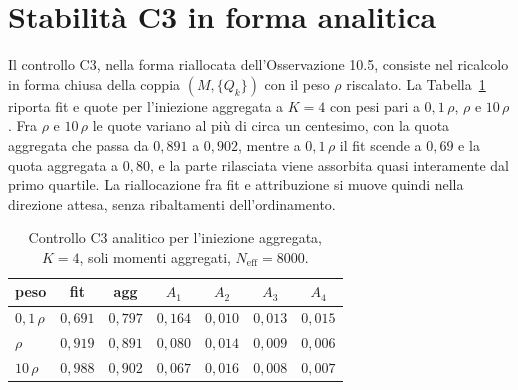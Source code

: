 \documentclass[11pt,a4paper]{article}
\newcommand{\Neff}{N_{\mathrm{eff}}}
\begin{document}
\section{Stabilit\`a C3 in forma analitica}\label{sec:c3}
Il controllo C3, nella forma riallocata dell'Osservazione 10.5, consiste nel ricalcolo in forma chiusa della coppia $(M,\{Q_k\})$ con il peso $\rho$ riscalato. La Tabella~\ref{tab:c3} riporta fit e quote per l'iniezione aggregata a $K=4$ con pesi pari a $0{,}1\,\rho$, $\rho$ e $10\,\rho$. Fra $\rho$ e $10\,\rho$ le quote variano al pi\`u di circa un centesimo, con la quota aggregata che passa da $0{,}891$ a $0{,}902$, mentre a $0{,}1\,\rho$ il fit scende a $0{,}69$ e la quota aggregata a $0{,}80$, e la parte rilasciata viene assorbita quasi interamente dal primo quartile. La riallocazione fra fit e attribuzione si muove quindi nella direzione attesa, senza ribaltamenti dell'ordinamento.

\begin{table}[t]
\centering\small
\caption{Controllo C3 analitico per l'iniezione aggregata, $K=4$, soli momenti aggregati, $\Neff=8000$.}
\label{tab:c3}
\begin{tabular}{lcccccc}
\toprule
peso & fit & agg & $A_1$ & $A_2$ & $A_3$ & $A_4$\\
\midrule
$0{,}1\,\rho$ & $0{,}691$ & $0{,}797$ & $0{,}164$ & $0{,}010$ & $0{,}013$ & $0{,}015$\\
$\rho$ & $0{,}919$ & $0{,}891$ & $0{,}080$ & $0{,}014$ & $0{,}009$ & $0{,}006$\\
$10\,\rho$ & $0{,}988$ & $0{,}902$ & $0{,}067$ & $0{,}016$ & $0{,}008$ & $0{,}007$\\
\bottomrule
\end{tabular}
\end{table}
\end{document}
